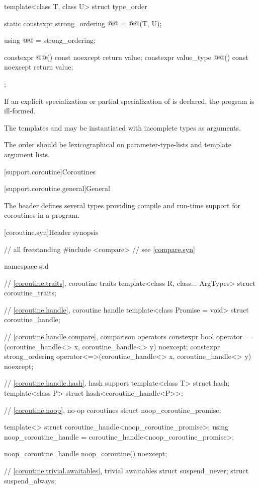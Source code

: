 %
\begin{itemdecl}
template<class T, class U> struct type_order {
  static constexpr strong_ordering @@ = @@(T, U);

  using @@ = strong_ordering;

  constexpr @@() const noexcept { return value; }
  constexpr value_type @@() const noexcept { return value; }
};
\end{itemdecl}

\begin{itemdescr}
\pnum
If an explicit specialization or partial specialization of  is declared,
the program is ill-formed.

\pnum
The templates  and 
may be instantiated with incomplete types as arguments.

\pnum
\recommended
The order should be lexicographical on parameter-type-lists and template argument lists.
\end{itemdescr}

[support.coroutine]{Coroutines}

[support.coroutine.general]{General}

\pnum
The header 
defines several types providing
compile and run-time support for
coroutines in a \Cpp{} program.

[coroutine.syn]{Header  synopsis}

%
%
\begin{codeblock}
// all freestanding
#include <compare>              // see \ref{compare.syn}

namespace std {
  // \ref{coroutine.traits}, coroutine traits
  template<class R, class... ArgTypes>
    struct coroutine_traits;

  // \ref{coroutine.handle}, coroutine handle
  template<class Promise = void>
    struct coroutine_handle;

  // \ref{coroutine.handle.compare}, comparison operators
  constexpr bool operator==(coroutine_handle<> x, coroutine_handle<> y) noexcept;
  constexpr strong_ordering operator<=>(coroutine_handle<> x, coroutine_handle<> y) noexcept;

  // \ref{coroutine.handle.hash}, hash support
  template<class T> struct hash;
  template<class P> struct hash<coroutine_handle<P>>;

  // \ref{coroutine.noop}, no-op coroutines
  struct noop_coroutine_promise;

  template<> struct coroutine_handle<noop_coroutine_promise>;
  using noop_coroutine_handle = coroutine_handle<noop_coroutine_promise>;

  noop_coroutine_handle noop_coroutine() noexcept;

  // \ref{coroutine.trivial.awaitables}, trivial awaitables
  struct suspend_never;
  struct suspend_always;
}
\end{codeblock}

